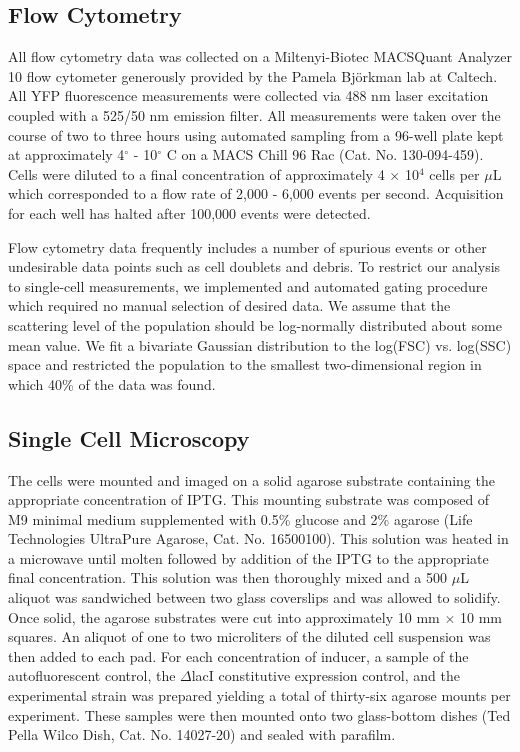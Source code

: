 \documentclass[letterpaper, 10pt]{article}
\begin{document}
\subsection*{Flow Cytometry}
All flow cytometry data was collected on a Miltenyi-Biotec MACSQuant Analyzer
10  flow cytometer generously provided by the Pamela Bj\"{o}rkman lab at
Caltech. All  YFP fluorescence measurements were collected via 488 nm laser
excitation coupled with a 525/50 nm emission filter. All measurements were
taken over the course of two to three hours using automated sampling from a
96-well plate kept at approximately 4$^\circ$ - 10$^\circ$ C on a MACS Chill
96 Rac (Cat. No. 130-094-459). Cells were diluted to a final concentration of
approximately 4 $\times$ 10$^4$ cells per $\mu$L which corresponded to a flow
rate of 2,000 - 6,000 events per second. Acquisition for each well has halted
after 100,000 events were detected.

Flow cytometry data  frequently includes a number of spurious events or other
undesirable data points such as cell doublets and debris. To restrict our
analysis to single-cell measurements, we implemented and automated gating
procedure which required no manual selection of desired data. We assume that
the scattering level of the population should be log-normally distributed about
some mean value. We fit a bivariate Gaussian distribution to the log(FSC) vs.
log(SSC) space and restricted the population  to the smallest two-dimensional
region in which 40\% of the data was found.

\subsection*{Single Cell Microscopy}

The cells were mounted and imaged on a solid agarose substrate containing the
appropriate concentration of IPTG. This mounting
substrate was composed of M9 minimal medium supplemented with 0.5\% glucose and
2\% agarose (Life Technologies UltraPure Agarose, Cat. No. 16500100). This
solution was heated in a microwave until molten followed by addition of the
IPTG to the appropriate final concentration. This solution was then thoroughly
mixed and a 500 $\mu$L aliquot was sandwiched between two glass coverslips and was
allowed to solidify. Once solid, the agarose substrates were cut into
approximately 10 mm $\times$ 10 mm squares. An aliquot of one to two microliters of
the diluted cell suspension was then added to each pad. For each concentration
of inducer, a sample of the autofluorescent control, the $\Delta$lacI
constitutive expression control, and the experimental strain was prepared
yielding a total of thirty-six agarose mounts per experiment. These samples
were then mounted onto two glass-bottom dishes (Ted Pella Wilco Dish, Cat. No.
14027-20) and sealed with parafilm.
\end{document}
